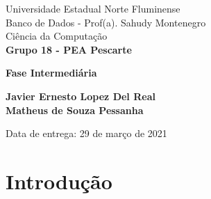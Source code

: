 \documentclass[11pt]{../../classes/ifscarticle}
\begin{document}
\begin{center}

    {\large Universidade Estadual Norte Fluminense}\\[0.2cm] %
    {\large Banco de Dados - Prof(a). Sahudy Montenegro }\\[0.2cm] %
    {\large Ciência da Computação}\\[5.2cm]


    {\Huge \bfseries Grupo 18 - PEA Pescarte}

    \vspace{.5cm}

    {\LARGE \bfseries Fase Intermediária}

    \vfill
\end{center}
\begin{tabbing}

\end{tabbing}

{\noindent \large \bfseries
Javier Ernesto Lopez Del Real
\\[.5em] Matheus de Souza Pessanha
}


\begin{flushright}
    Data de entrega: 29 de mar\c{c}o de 2021
\end{flushright}

\clearpage
\pagestyle{firstpage}


\tableofcontents
\clearpage


\section{Introdução}
\label{sec:introducao}
\end{document}
